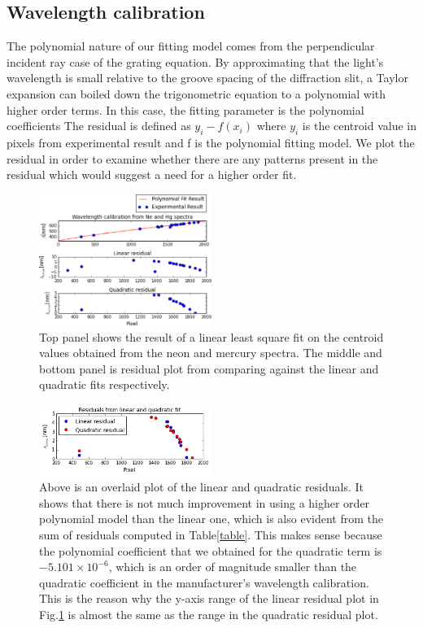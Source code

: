 \documentclass[authoryear, 12pt,5p, times]{elsarticle}
\begin{document}
\subsection{Wavelength calibration}
The polynomial nature of our fitting model comes from the perpendicular incident ray case of the grating equation. By approximating that the light's wavelength is small relative to the groove spacing of the diffraction slit, a Taylor expansion can boiled down the trigonometric equation to a polynomial with higher order terms. In this case, the fitting parameter is the polynomial coefficients The residual is defined as $y_i-f(x_i)$ where $y_i$ is the centroid value in pixels from experimental result and f is the polynomial fitting model.  We plot the residual in order to examine whether  there are any patterns present in the residual which would suggest a need for a higher order fit.
\begin{figure}
\includegraphics[width=0.5\textwidth]{figures/neon_calib}
\caption{Top panel shows the result of a linear least square fit on the centroid values obtained from the neon and mercury spectra. The middle and bottom panel is residual plot from comparing against the linear and quadratic fits respectively.}\label{neon_calib}
\end{figure}
\begin{figure}
\label{comp_linquad}
\includegraphics[width=0.5\textwidth]{figures/compare_linquad}
\caption{Above is an overlaid plot of the linear and quadratic residuals. It shows that there is not much improvement in using a higher order polynomial model than the linear one, which is also evident from the sum of residuals computed in Table\ref{table}. This makes sense because the polynomial coefficient that we obtained for the quadratic term is $-5.101\times 10^{-6}$, which is an order of magnitude smaller than the quadratic coefficient in the manufacturer's wavelength calibration. This is the reason why the y-axis range of the linear residual plot in Fig.\ref{neon_calib} is almost the same as the range in the quadratic residual plot.} 
\end{figure}
\end{document}
